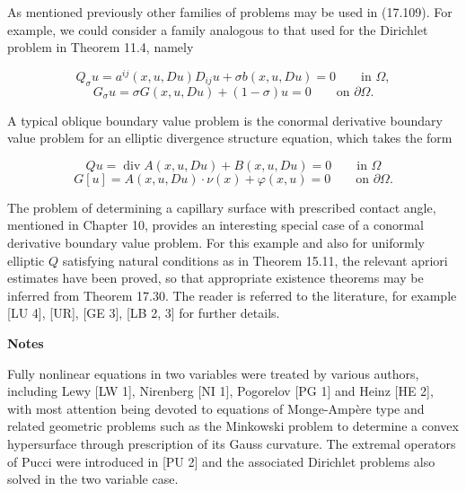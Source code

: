 As mentioned previously other families of problems may be used in (17.109). For example, we could consider a family analogous to that used for the Dirichlet problem in Theorem 11.4, namely

\begin{equation}
Q_{\sigma}u = a^{ij}(x,u,Du)D_{i j}u + \sigma b(x,u,Du) = 0 \qquad \text{in } \Omega,
\tag{17.110}
\end{equation}
\begin{equation}
G_{\sigma}u = \sigma G(x,u,Du) + (1-\sigma)u = 0 \qquad \text{on } \partial \Omega.
\end{equation}

A typical oblique boundary value problem is the conormal derivative boundary value problem for an elliptic divergence structure equation, which takes the form

\begin{equation}
Qu = \operatorname{div} A(x,u,Du) + B(x,u,Du) = 0 \qquad \text{in } \Omega
\tag{17.111}
\end{equation}
\begin{equation}
G[u] = A(x,u,Du)\cdot \nu(x) + \varphi(x,u) = 0 \qquad \text{on } \partial \Omega.
\end{equation}

The problem of determining a capillary surface with prescribed contact angle, mentioned in Chapter 10, provides an interesting special case of a conormal derivative boundary value problem. For this example and also for uniformly elliptic $Q$ satisfying natural conditions as in Theorem 15.11, the relevant apriori estimates have been proved, so that appropriate existence theorems may be inferred from Theorem 17.30. The reader is referred to the literature, for example [LU 4], [UR], [GE 3], [LB 2, 3] for further details.

\bigskip

\textbf{Notes}

Fully nonlinear equations in two variables were treated by various authors, including Lewy [LW 1], Nirenberg [NI 1], Pogorelov [PG 1] and Heinz [HE 2], with most attention being devoted to equations of Monge-Ampère type and related geometric problems such as the Minkowski problem to determine a convex hypersurface through prescription of its Gauss curvature. The extremal operators of Pucci were introduced in [PU 2] and the associated Dirichlet problems also solved in the two variable case.

